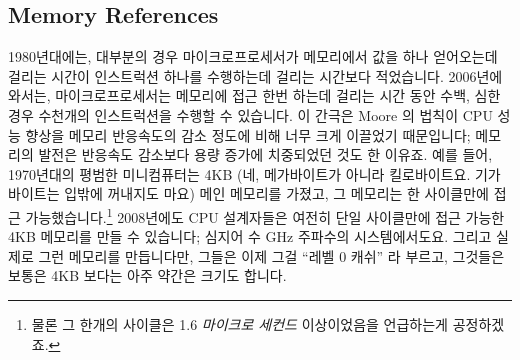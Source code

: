 \subsection{Memory References}
\label{sec:cpu:Memory References}

1980년대에는, 대부분의 경우 마이크로프로세서가 메모리에서 값을 하나 얻어오는데
걸리는 시간이 인스트럭션 하나를 수행하는데 걸리는 시간보다 적었습니다.
2006년에 와서는, 마이크로프로세서는 메모리에 접근 한번 하는데 걸리는 시간 동안
수백, 심한 경우 수천개의 인스트럭션을 수행할 수 있습니다.
이 간극은 Moore 의 법칙이 CPU 성능 향상을 메모리 반응속도의 감소 정도에 비해
너무 크게 이끌었기 때문입니다; 메모리의 발전은 반응속도 감소보다 용량 증가에
치중되었던 것도 한 이유죠.
예를 들어, 1970년대의 평범한 미니컴퓨터는 4KB (네, 메가바이트가 아니라
킬로바이트요. 기가바이트는 입밖에 꺼내지도 마요) 메인 메모리를 가졌고, 그
메모리는 한 사이클만에 접근 가능했습니다.\footnote{
	물론 그 한개의 사이클은 1.6 \emph{마이크로 세컨드} 이상이었음을
	언급하는게 공정하겠죠.}
2008년에도 CPU 설계자들은 여전히 단일 사이클만에 접근 가능한 4KB 메모리를 만들
수 있습니다; 심지어 수 GHz 주파수의 시스템에서도요.
그리고 실제로 그런 메모리를 만듭니다만, 그들은 이제 그걸 ``레벨 0 캐쉬'' 라
부르고, 그것들은 보통은 4KB 보다는 아주 약간은 크기도 합니다.

